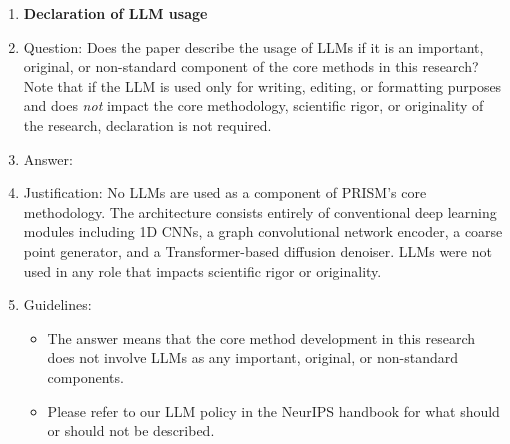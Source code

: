\begin{enumerate}
\item {\bf Declaration of LLM usage}
    \item[] Question: Does the paper describe the usage of LLMs if it is an important, original, or non-standard component of the core methods in this research? Note that if the LLM is used only for writing, editing, or formatting purposes and does \emph{not} impact the core methodology, scientific rigor, or originality of the research, declaration is not required.
    \item[] Answer: \answerNA{}
    \item[] Justification: No LLMs are used as a component of PRISM's core methodology. The architecture consists entirely of conventional deep learning modules including 1D CNNs, a graph convolutional network encoder, a coarse point generator, and a Transformer-based diffusion denoiser. LLMs were not used in any role that impacts scientific rigor or originality.
    \item[] Guidelines:
    \begin{itemize}
        \item The answer \answerNA{} means that the core method development in this research does not involve LLMs as any important, original, or non-standard components.
        \item Please refer to our LLM policy in the NeurIPS handbook for what should or should not be described.
    \end{itemize}

\end{enumerate}
